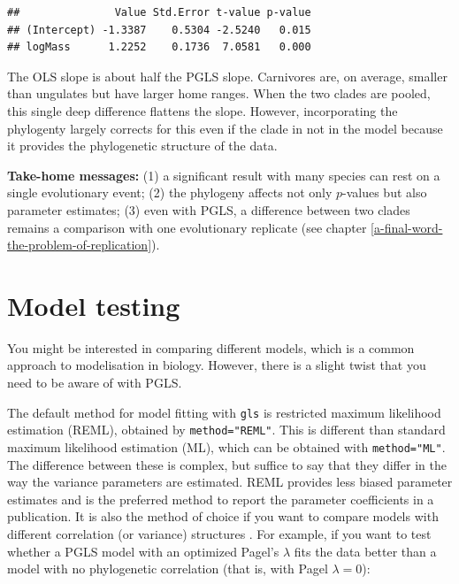 \documentclass[
]{book}
\newenvironment{Shaded}{\begin{snugshade}}{\end{snugshade}}
\newcommand{\AttributeTok}[1]{\textcolor[rgb]{0.13,0.29,0.53}{#1}}
\newcommand{\DecValTok}[1]{\textcolor[rgb]{0.00,0.00,0.81}{#1}}
\newcommand{\FloatTok}[1]{\textcolor[rgb]{0.00,0.00,0.81}{#1}}
\newcommand{\FunctionTok}[1]{\textcolor[rgb]{0.13,0.29,0.53}{\textbf{#1}}}
\newcommand{\NormalTok}[1]{#1}
\newcommand{\SpecialCharTok}[1]{\textcolor[rgb]{0.81,0.36,0.00}{\textbf{#1}}}
\begin{document}
\begin{Shaded}
\end{Shaded}

\begin{verbatim}
##               Value Std.Error t-value p-value
## (Intercept) -1.3387    0.5304 -2.5240   0.015
## logMass      1.2252    0.1736  7.0581   0.000
\end{verbatim}

The OLS slope is about half the PGLS slope. Carnivores are, on average, smaller than ungulates but have larger home ranges. When the two clades are pooled, this single deep difference flattens the slope. However, incorporating the phylogenty largely corrects for this even if the clade in not in the model because it provides the phylogenetic structure of the data.

\textbf{Take-home messages:} (1) a significant result with many species can rest on a single evolutionary event; (2) the phylogeny affects not only \(p\)-values but also parameter estimates; (3) even with PGLS, a difference between two clades remains a comparison with one evolutionary replicate (see chapter \ref{a-final-word-the-problem-of-replication}).

\chapter{Model testing}\label{model-testing}

You might be interested in comparing different models, which is a common approach to modelisation in biology. However, there is a slight twist that you need to be aware of with PGLS.

The default method for model fitting with \texttt{gls} is restricted maximum likelihood estimation (REML), obtained by \texttt{method="REML"}. This is different than standard maximum likelihood estimation (ML), which can be obtained with \texttt{method="ML"}. The difference between these is complex, but suffice to say that they differ in the way the variance parameters are estimated. REML provides less biased parameter estimates and is the preferred method to report the parameter coefficients in a publication. It is also the method of choice if you want to compare models with different correlation (or variance) structures \citep{zuur2009mixed}. For example, if you want to test whether a PGLS model with an optimized Pagel's \(\lambda\) fits the data better than a model with no phylogenetic correlation (that is, with Pagel \(\lambda=0\)):
\end{document}
